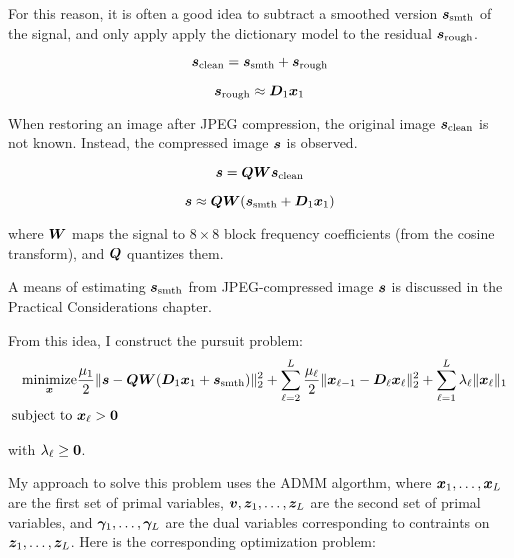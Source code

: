 For this reason, it is often a good idea to subtract a smoothed version $\bm{s}_{\text{smth}}$ of the signal, and only apply apply the dictionary model to the residual $\bm{s}_{\text{rough}}$.

\begin{equation}
\bm{s}_{\text{clean}} = \bm{s}_{\text{smth}} + \bm{s}_{\text{rough}}
\end{equation}

\begin{equation}
\bm{s}_{\text{rough}} \approx \bm{D}_1\bm{x}_1
\end{equation}

When restoring an image after JPEG compression, the original image $\bm{s}_{\text{clean}}$ is not known. Instead, the compressed image $\bm{s}$ is observed.

\begin{equation}
\bm{s} = \bm{Q}\bm{W}\bm{s}_{\text{clean}}
\end{equation}

\begin{equation}
\bm{s} \approx \bm{Q}\bm{W}(\bm{s}_{\text{smth}} + \bm{D}_1\bm{x}_1)
\end{equation}

where $\bm{W}$ maps the signal to $8 \times 8$ block frequency coefficients (from the cosine transform), and $\bm{Q}$ quantizes them.

A means of estimating $\bm{s}_{\text{smth}}$ from JPEG-compressed image $\bm{s}$ is discussed in the Practical Considerations chapter.

From this idea, I construct the pursuit problem:
\begin{equation}
\begin{aligned}
\operatorname*{\text{minimize}}_{\bm{x}} & \frac{\mu_1}{2}\|\bm{s} - \bm{Q}\bm{W}(\bm{D}_1\bm{x}_1 + \bm{s}_{\text{smth}})\|_2^2 + \sum_{\ell = 2}^L \frac{\mu_{\ell}}{2}\|\bm{x}_{\ell - 1} - \bm{D}_{\ell}\bm{x}_{\ell}\|_2^2 + \sum_{\ell = 1}^L \lambda_{\ell}\|\bm{x}_{\ell}\|_1 \\
\text{subject to } & \bm{x}_{\ell} > \bm{0}
\end{aligned}
\end{equation}

with $\lambda_{\ell} \geq \bm{0}$.

My approach to solve this problem uses the ADMM algorthm, where $\bm{x}_1,\ldots,\bm{x}_L$ are the first set of primal variables, $\bm{v},\bm{z}_1,\ldots,\bm{z}_L$ are the second set of primal variables,  and $\bm{\gamma}_1,\ldots,\bm{\gamma}_L$ are the dual variables corresponding to contraints on $\bm{z}_1,\ldots,\bm{z}_L$.  Here is the corresponding optimization problem:

